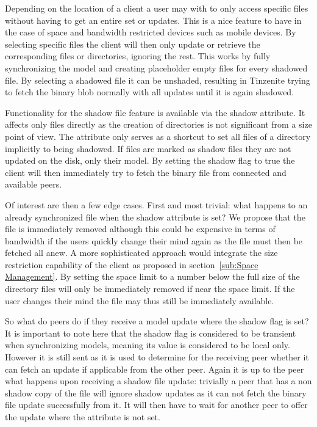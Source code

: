 Depending on the location of a client a user may with to only access specific files without having to get an entire set or updates.
This is a nice feature to have in the case of space and bandwidth restricted devices such as mobile devices.
By selecting specific files the client will then only update or retrieve the corresponding files or directories, ignoring the rest.
This works by fully synchronizing the model and creating placeholder empty files for every shadowed file.
By selecting a shadowed file it can be unshaded, resulting in Tinzenite trying to fetch the binary blob normally with all updates until it is again shadowed.

Functionality for the shadow file feature is available via the shadow attribute.
It affects only files directly as the creation of directories is not significant from a size point of view.
The attribute only serves as a shortcut to set all files of a directory implicitly to being shadowed.
If files are marked as shadow files they are not updated on the disk, only their model.
By setting the shadow flag to true the client will then immediately try to fetch the binary file from connected and available peers.

Of interest are then a few edge cases.
First and most trivial: what happens to an already synchronized file when the shadow attribute is set?
We propose that the file is immediately removed although this could be expensive in terms of bandwidth if the users quickly change their mind again as the file must then be fetched all anew.
A more sophisticated approach would integrate the size restriction capability of the client as proposed in section~\ref{sub:Space Management}.
By setting the space limit to a number below the full size of the directory files will only be immediately removed if near the space limit.
If the user changes their mind the file may thus still be immediately available.

So what do peers do if they receive a model update where the shadow flag is set?
It is important to note here that the shadow flag is considered to be transient when synchronizing models, meaning its value is considered to be local only.
However it is still sent as it is used to determine for the receiving peer whether it can fetch an update if applicable from the other peer.
Again it is up to the peer what happens upon receiving a shadow file update: trivially a peer that has a non shadow copy of the file will ignore shadow updates as it can not fetch the binary file update successfully from it.
It will then have to wait for another peer to offer the update where the attribute is not set.

